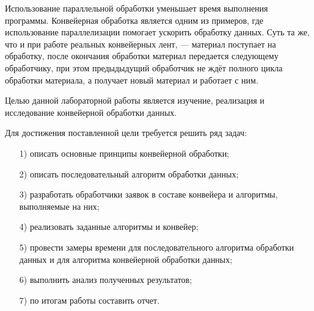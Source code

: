 

Использование параллельной обработки уменьшает время выполнения программы. Конвейерная обработка является одним из примеров, где использование параллелизации помогает ускорить обработку данных. Суть та же, что и при работе реальных конвейерных лент, ---
материал поступает на обработку, после окончания обработки материал передается следующему обработчику, при этом предыдыдущий
обработчик не ждёт полного цикла обработки материала, а получает новый
материал и работает с ним.

Целью данной лабораторной работы является изучение, реализация и исследование конвейерной обработки данных.

Для достижения поставленной цели требуется решить ряд задач:
\begin{enumerate}
	\item[1)] описать основные принципы конвейерной обработки;
	\item[2)] описать последовательный алгоритм обработки данных;
	\item[3)]
	разработать обработчики заявок в составе конвейера и алгоритмы, выполняемые на них;
	\item[4)] реализовать заданные алгоритмы и конвейер;
	\item[5)] провести замеры времени для последовательного алгоритма обработки данных и для алгоритма конвейерной обработки данных;%
 	\item[6)] выполнить анализ полученных результатов;
	\item[7)] по итогам работы составить отчет.
\end{enumerate}

\newpage
